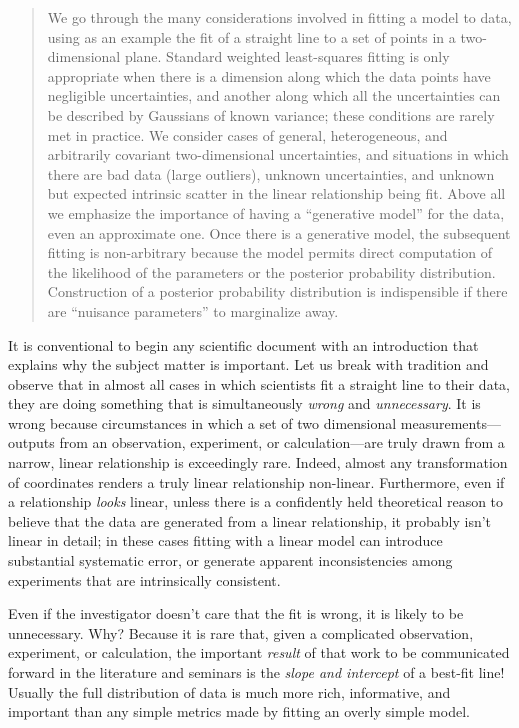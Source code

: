 \documentclass[12pt,twoside]{article}
\newcommand{\numberparagraphs}{}
\begin{document}
\begin{abstract}
  We go through the many considerations involved in fitting a model to
  data, using as an example the fit of a straight line to a set of
  points in a two-dimensional plane.  Standard weighted least-squares
  fitting is only appropriate when there is a dimension along which
  the data points have negligible uncertainties, and another along
  which all the uncertainties can be described by Gaussians of known
  variance; these conditions are rarely met in practice.  We consider
  cases of general, heterogeneous, and arbitrarily covariant
  two-dimensional uncertainties, and situations in which there are bad
  data (large outliers), unknown uncertainties, and unknown but
  expected intrinsic scatter in the linear relationship being fit.
  Above all we emphasize the importance of having a ``generative
  model'' for the data, even an approximate one.  Once there is a
  generative model, the subsequent fitting is non-arbitrary because
  the model permits direct computation of the likelihood of the
  parameters or the posterior probability distribution.  Construction
  of a posterior probability distribution is indispensible if there
  are ``nuisance parameters'' to marginalize away.
\end{abstract}

\numberparagraphs

It is conventional to begin any scientific document with an
introduction that explains why the subject matter is important.  Let
us break with tradition and observe that in almost all cases in which
scientists fit a straight line to their data, they are doing something
that is simultaneously \emph{wrong} and \emph{unnecessary}.  It is
wrong because circumstances in which a set of two dimensional
measurements---outputs from an observation, experiment, or
calculation---are truly drawn from a narrow, linear relationship is
exceedingly rare.  Indeed, almost any transformation of coordinates
renders a truly linear relationship non-linear.  Furthermore, even if
a relationship \emph{looks} linear, unless there is a confidently held
theoretical reason to believe that the data are generated from a
linear relationship, it probably isn't linear in detail; in these
cases fitting with a linear model can introduce substantial systematic
error, or generate apparent inconsistencies among experiments that are
intrinsically consistent.

Even if the investigator doesn't care that the fit is wrong, it is
likely to be unnecessary.  Why?  Because it is rare that, given a
complicated observation, experiment, or calculation, the important
\emph{result} of that work to be communicated forward in the
literature and seminars is the \emph{slope and intercept} of a
best-fit line!  Usually the full distribution of data is much more
rich, informative, and important than any simple metrics made by
fitting an overly simple model.
\end{document}
